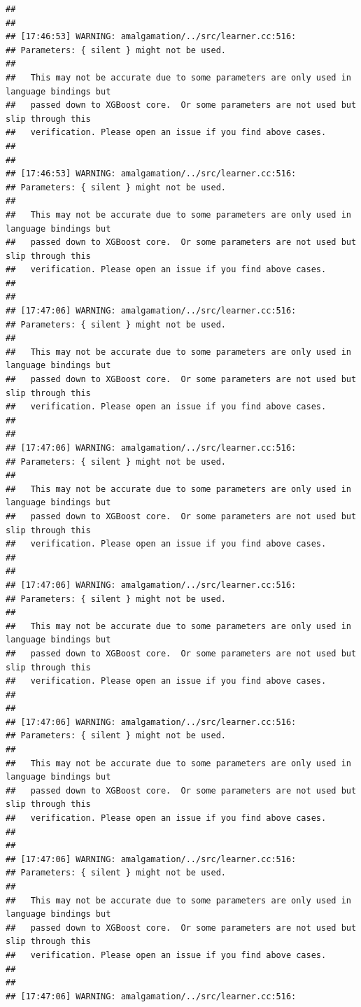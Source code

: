 \documentclass[AMS,STIX2COL]{WileyNJD-v2}\usepackage[]{graphicx}\usepackage[]{color}
\makeatletter
\newenvironment{kframe}{%
 \def\at@end@of@kframe{}%
 \ifinner\ifhmode%
  \def\at@end@of@kframe{\end{minipage}}%
  \begin{minipage}{\columnwidth}%
 \fi\fi%
 \def\FrameCommand##1{\hskip\@totalleftmargin \hskip-\fboxsep
 \colorbox{shadecolor}{##1}\hskip-\fboxsep
     \hskip-\linewidth \hskip-\@totalleftmargin \hskip\columnwidth}%
 \MakeFramed {\advance\hsize-\width
   \@totalleftmargin\z@ \linewidth\hsize
   \@setminipage}}%
 {\par\unskip\endMakeFramed%
 \at@end@of@kframe}
\newenvironment{knitrout}{}{} %
\makeatother
\begin{document}
\begin{knitrout}
\begin{kframe}
\begin{verbatim}
## 
## 
## [17:46:53] WARNING: amalgamation/../src/learner.cc:516: 
## Parameters: { silent } might not be used.
## 
##   This may not be accurate due to some parameters are only used in language bindings but
##   passed down to XGBoost core.  Or some parameters are not used but slip through this
##   verification. Please open an issue if you find above cases.
## 
## 
## [17:46:53] WARNING: amalgamation/../src/learner.cc:516: 
## Parameters: { silent } might not be used.
## 
##   This may not be accurate due to some parameters are only used in language bindings but
##   passed down to XGBoost core.  Or some parameters are not used but slip through this
##   verification. Please open an issue if you find above cases.
## 
## 
## [17:47:06] WARNING: amalgamation/../src/learner.cc:516: 
## Parameters: { silent } might not be used.
## 
##   This may not be accurate due to some parameters are only used in language bindings but
##   passed down to XGBoost core.  Or some parameters are not used but slip through this
##   verification. Please open an issue if you find above cases.
## 
## 
## [17:47:06] WARNING: amalgamation/../src/learner.cc:516: 
## Parameters: { silent } might not be used.
## 
##   This may not be accurate due to some parameters are only used in language bindings but
##   passed down to XGBoost core.  Or some parameters are not used but slip through this
##   verification. Please open an issue if you find above cases.
## 
## 
## [17:47:06] WARNING: amalgamation/../src/learner.cc:516: 
## Parameters: { silent } might not be used.
## 
##   This may not be accurate due to some parameters are only used in language bindings but
##   passed down to XGBoost core.  Or some parameters are not used but slip through this
##   verification. Please open an issue if you find above cases.
## 
## 
## [17:47:06] WARNING: amalgamation/../src/learner.cc:516: 
## Parameters: { silent } might not be used.
## 
##   This may not be accurate due to some parameters are only used in language bindings but
##   passed down to XGBoost core.  Or some parameters are not used but slip through this
##   verification. Please open an issue if you find above cases.
## 
## 
## [17:47:06] WARNING: amalgamation/../src/learner.cc:516: 
## Parameters: { silent } might not be used.
## 
##   This may not be accurate due to some parameters are only used in language bindings but
##   passed down to XGBoost core.  Or some parameters are not used but slip through this
##   verification. Please open an issue if you find above cases.
## 
## 
## [17:47:06] WARNING: amalgamation/../src/learner.cc:516: 

\end{verbatim}
\end{kframe}
\end{knitrout}
\end{document}
